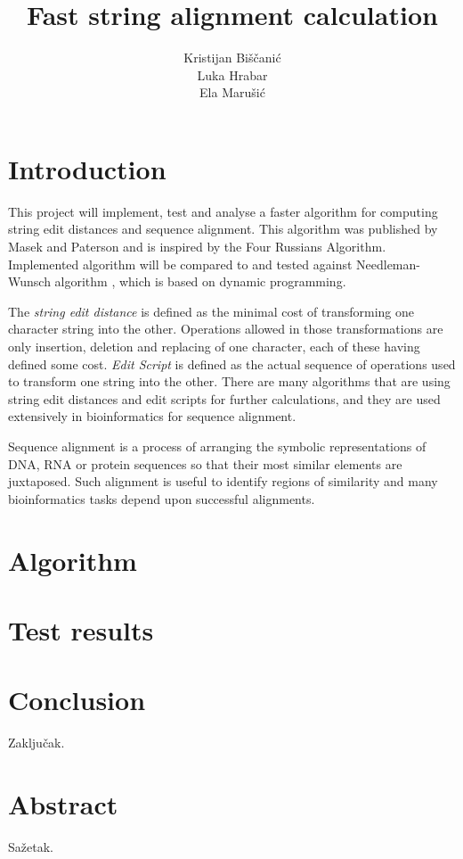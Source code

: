 \documentclass[times, utf8, seminar, numeric]{fer}
\begin{document}
\title{Fast string alignment calculation}

\author{Kristijan Biščanić \\ Luka Hrabar \\ Ela Marušić}

\maketitle

\tableofcontents

\chapter{Introduction}
This project will implement, test and analyse a faster algorithm for computing string edit distances and sequence alignment. This algorithm was published by Masek and Paterson \cite{masek1980faster} and is inspired by the Four Russians Algorithm. Implemented algorithm will be compared to and tested against Needleman-Wunsch algorithm \cite{needleman1970general}, which is based on dynamic programming.

The \textit{string edit distance} is defined as the minimal cost of transforming one character string into the other. Operations allowed in those transformations are only insertion, deletion and replacing of one character, each of these having defined some cost. \textit{Edit Script} is defined as the actual sequence of operations used to transform one string into the other. There are many algorithms that are using string edit distances and edit scripts for further calculations, and they are used extensively in bioinformatics for sequence alignment.

Sequence alignment is a process of arranging the symbolic representations of DNA, RNA or protein sequences so that their most similar elements are juxtaposed. Such alignment is useful to identify regions of similarity and many bioinformatics tasks depend upon successful alignments.

\chapter{Algorithm}

\chapter{Test results}

\chapter{Conclusion}
Zaključak.




\chapter{Abstract}
Sažetak.

\nocite{*}
\end{document}
